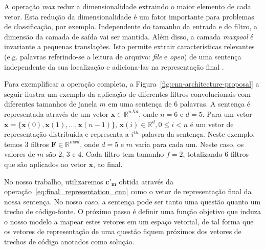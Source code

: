 A operação \textit{max} reduz a dimensionalidade extraindo o maior elemento de cada vetor. Esta redução da dimensionalidade é um fator importante para problemas de classificação, por exemplo. Independente do tamanho da entrada e do filtro, a dimensão da camada de saída vai ser mantida. Além disso, a camada \textit{maxpool} é invariante a pequenas translações. Isto permite extrair características relevantes (e.g. palavras referindo-se a leitura de arquivo: \emph{file} e \emph{open}) de uma sentença independente da sua localização e adiciona-las na representação final \citep{tom-young:trends-deep-learning-nlp}.

Para exemplificar a operação completa, a Figura~\ref{fig:cnn-architecture-proposal} a seguir ilustra um exemplo da aplicação de diferentes filtros convolucionais com diferentes tamanhos de janela $m$ em uma sentença de 6 palavras. A sentença é representada através de um vetor $\bm{x} \in \mathbb{R}^{n X d}$, onde $n = 6$ e $d = 5$. Para um vetor $\bm{x} = \{\bm{x}(0), \bm{x}(1), . . ., \bm{x}(n - 1) \}$, $\bm{x}(i) \in \mathbb{R}^{d}, 0 \leq i < n$ é um vetor de representação distribuída e representa a $i^{th}$ palavra da sentença. Neste exemplo, temos 3 filtros $\bm{F} \in \mathbb{R}^{m x d}$, onde $d = 5$ e $m$ varia para cada um. Neste caso, os valores de $m$ são $2$, $3$ e $4$. Cada filtro tem tamanho $f = 2$, totalizando 6 filtros que são aplicados ao vetor $\bm{x}$, ao final.

No nosso trabalho, utilizaremos $\bm{c'}_{\bm{m}}$ obtida através da operação~\ref{eq:final_representation_cnn} como o vetor de representação final da nossa sentença. No nosso caso, a sentença pode ser tanto uma questão quanto um trecho de código-fonte. O próximo passo é definir uma função objetivo que induza o nosso modelo a mapear estes vetores em um espaço vetorial, de tal forma que os vetores de representação de uma questão fiquem próximos dos vetores de trechos de código anotados como solução.

